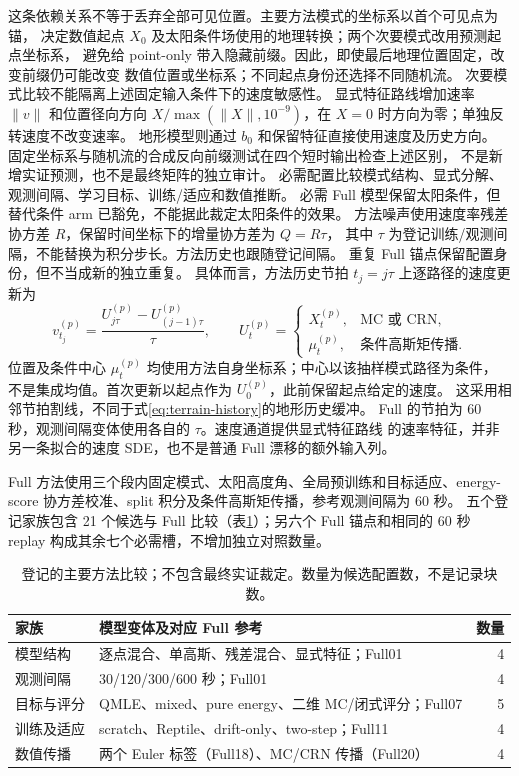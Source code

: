 \documentclass[UTF8,11pt]{ctexart}
\begin{document}
这条依赖关系不等于丢弃全部可见位置。主要方法模式的坐标系以首个可见点为锚，
决定数值起点 \(X_0\) 及太阳条件场使用的地理转换；两个次要模式改用预测起点坐标系，
避免给 point-only 带入隐藏前缀。因此，即使最后地理位置固定，改变前缀仍可能改变
数值位置或坐标系；不同起点身份还选择不同随机流。
次要模式比较不能隔离上述固定输入条件下的速度敏感性。
显式特征路线增加速率 \(\|v\|\) 和位置径向方向
\(X/\max(\|X\|,10^{-9})\)，在 \(X=0\) 时方向为零；单独反转速度不改变速率。
地形模型则通过 \(b_0\) 和保留特征直接使用速度及历史方向。
固定坐标系与随机流的合成反向前缀测试在四个短时输出检查上述区别，
不是新增实证预测，也不是最终矩阵的独立审计。
必需配置比较模式结构、显式分解、观测间隔、学习目标、训练/适应和数值推断。
必需 Full 模型保留太阳条件，但替代条件 arm 已豁免，不能据此裁定太阳条件的效果。
方法噪声使用速度率残差协方差 \(R\)，保留时间坐标下的增量协方差为 \(Q=R\tau\)，
其中 \(\tau\) 为登记训练/观测间隔，不能替换为积分步长。方法历史也跟随登记间隔。
重复 Full 锚点保留配置身份，但不当成新的独立重复。
具体而言，方法历史节拍 \(t_j=j\tau\) 上逐路径的速度更新为
\begin{equation}
v^{(p)}_{t_j}=\frac{U^{(p)}_{j\tau}-U^{(p)}_{(j-1)\tau}}{\tau},\qquad
U^{(p)}_t=\begin{cases}
X^{(p)}_t,&\text{MC 或 CRN},\\
\mu^{(p)}_t,&\text{条件高斯矩传播}.
\end{cases}
\label{eq:method-history}
\end{equation}
位置及条件中心 \(\mu^{(p)}_t\) 均使用方法自身坐标系；中心以该抽样模式路径为条件，
不是集成均值。首次更新以起点作为 \(U^{(p)}_0\)，此前保留起点给定的速度。
这采用相邻节拍割线，不同于式\eqref{eq:terrain-history}的地形历史缓冲。
Full 的节拍为 60 秒，观测间隔变体使用各自的 \(\tau\)。速度通道提供显式特征路线
的速率特征，并非另一条拟合的速度 SDE，也不是普通 Full 漂移的额外输入列。

Full 方法使用三个段内固定模式、太阳高度角、全局预训练和目标适应、energy-score
协方差校准、split 积分及条件高斯矩传播，参考观测间隔为 60 秒。
五个登记家族包含 21 个候选与 Full 比较（表\ref{tab:method-families}）；另六个
Full 锚点和相同的 60 秒 replay 构成其余七个必需槽，不增加独立对照数量。

\begin{table}[htbp]
\centering\small
\caption{登记的主要方法比较；不包含最终实证裁定。数量为候选配置数，不是记录块数。}
\label{tab:method-families}
\begin{tabular}{p{.21\linewidth}p{.63\linewidth}r}
\hline
家族 & 模型变体及对应 Full 参考 & 数量\\
\hline
模型结构 & 逐点混合、单高斯、残差混合、显式特征；Full01 & 4\\
观测间隔 & 30/120/300/600 秒；Full01 & 4\\
目标与评分 & QMLE、mixed、pure energy、二维 MC/闭式评分；Full07 & 5\\
训练及适应 & scratch、Reptile、drift-only、two-step；Full11 & 4\\
数值传播 & 两个 Euler 标签（Full18）、MC/CRN 传播（Full20） & 4\\
\hline
\end{tabular}
\end{table}
\end{document}
